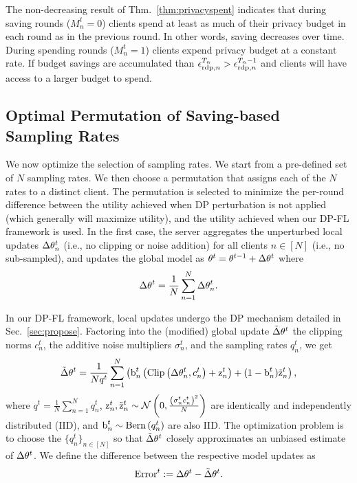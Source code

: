 \begin{remark}
The non-decreasing result of Thm.~\ref{thm:privacyspent} indicates that during saving rounds ($M_n^t = 0$) clients spend at least as much of their privacy budget in each round as in the previous round. In other words, saving decreases over time. During spending rounds ($M_n^t = 1$)  clients expend privacy budget at a constant rate.  If budget savings are accumulated than ${\epsilon}_{\text{rdp}, n}^{T_n} > {\epsilon}_{\text{rdp}, n}^{T_n-1}$ and clients will have access to a larger budget to spend.
\end{remark}


\subsection{Optimal Permutation of Saving-based Sampling Rates} \label{sec:theory:permutation}
We now optimize the selection of sampling rates. We start from a pre-defined set of $N$ sampling rates.  We then choose a permutation that assigns each of the $N$ rates to a distinct client. The permutation is selected to minimize the per-round difference between the utility achieved when DP perturbation is not applied (which generally will maximize utility), and the utility achieved when our DP-FL framework is used. In the first case, the server aggregates the unperturbed local updates $\Delta {\theta}_n^t$ (i.e., no clipping or noise addition) for all clients $n\in [N]$ (i.e., no  sub-sampled), and updates the global model as ${\theta}^t = {\theta}^{t-1} + \Delta {\theta}^t$ where 
\begin{align}
\Delta {\theta}^t = \frac{1}{N}\sum_{n=1}^N \Delta {\theta}_n^t. 
\end{align} 

In our DP-FL framework, local updates undergo the DP mechanism detailed in Sec.~\ref{sec:propose}. Factoring into the (modified) global update $\tilde{\Delta}{\theta}^t$ the clipping norms $c_n^t$, the additive noise multipliers $\sigma_n^t$, and the sampling rates $q_n^t$, we get
\begin{align}
\tilde{\Delta} {\theta}^t = \frac{1}{Nq^t}\sum_{n=1}^N \left({\textnormal{b}}_n^t \left(\text{Clip}\left({\Delta {\theta}_n^t}, c_n^t\right)+{\textnormal{z}}_n^t\right)+ (1-{\textnormal{b}}_n^t)\tilde{{\textnormal{z}}}_n^t\right),
\end{align} 
where $q^t=\frac{1}{N}\sum_{n=1}^N q_n^t$, ${\textnormal{z}}_n^t,\tilde{{\textnormal{z}}}_n^t \sim {\mathcal{N}}\left(0, \frac{\left(\sigma_n^tc_n^t\right)^2}{N}\right)$ are identically and independently distributed (IID), and ${\textnormal{b}}_n^t\sim \text{Bern}\left(q_n^t\right)$ are also IID. The optimization problem is to choose the $\{q_n^t\}_{n\in [N]}$ so that $\tilde{\Delta} {\theta}^t$ closely approximates an unbiased estimate of $\Delta {\theta}^t$. We define the difference between the respective model updates as
\begin{align}
\text{Error}^t:= \Delta {\theta}^t - \tilde{\Delta} {\theta}^t.
\end{align}

